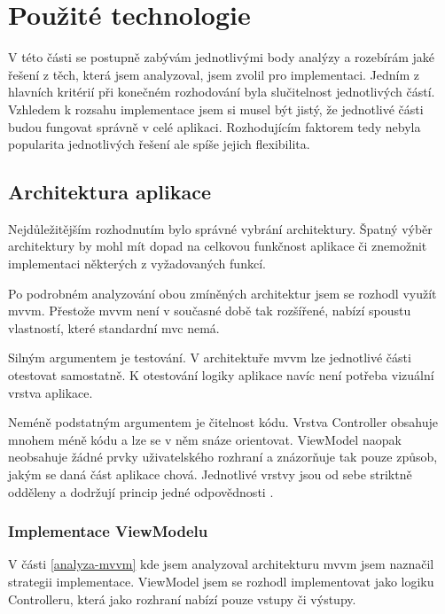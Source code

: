 \section{Použité technologie}

V této části se postupně zabývám jednotlivými body analýzy a rozebírám jaké řešení z těch, která jsem analyzoval, jsem zvolil pro implementaci.
Jedním z hlavních kritérií při konečném rozhodování byla slučitelnost jednotlivých částí.
Vzhledem k rozsahu implementace jsem si musel být jistý, že jednotlivé části budou fungovat správně v celé aplikaci.
Rozhodujícím faktorem tedy nebyla popularita jednotlivých řešení ale spíše jejich flexibilita.

\subsection{Architektura aplikace}\label{technologie-architektura}

Nejdůležitějším rozhodnutím bylo správné vybrání architektury.
Špatný výběr architektury by mohl mít dopad na celkovou funkčnost aplikace či znemožnit implementaci některých z vyžadovaných funkcí.

Po podrobném analyzování obou zmíněných architektur jsem se rozhodl využít \acrshort{mvvm}.
Přestože \acrshort{mvvm} není v současné době tak rozšířené, nabízí spoustu vlastností, které standardní \acrshort{mvc} nemá.

Silným argumentem je testování.
V architektuře \acrshort{mvvm} lze jednotlivé části otestovat samostatně.
K otestování logiky aplikace navíc není potřeba vizuální vrstva aplikace.

Neméně podstatným argumentem je čitelnost kódu.
Vrstva Controller obsahuje mnohem méně kódu a lze se v něm snáze orientovat.
ViewModel naopak neobsahuje žádné prvky uživatelského rozhraní a znázorňuje tak pouze způsob, jakým se daná část aplikace chová.
Jednotlivé vrstvy jsou od sebe striktně odděleny a dodržují princip jedné odpovědnosti \cite{toptal-srp}.

\subsubsection*{Implementace ViewModelu}

V části \ref{analyza-mvvm} kde jsem analyzoval architekturu \acrshort{mvvm} jsem naznačil strategii implementace.
ViewModel jsem se rozhodl implementovat jako logiku Controlleru, která jako rozhraní nabízí pouze vstupy či výstupy.

